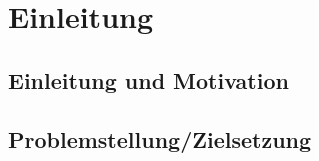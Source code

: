 \section{Einleitung}\label{einleitung}
\subsection{Einleitung und Motivation}\label{einleitung-und-motivation}

\subsection{Problemstellung/Zielsetzung}\label{problemstellung-zielsetzung}